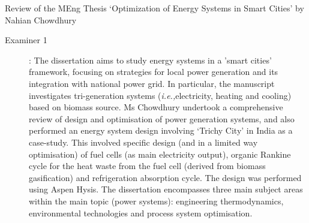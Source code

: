 \documentclass[14pt,twoside]{report}
\newcommand{\ie}{{\it i.e.,}}
\begin{document}

\bigskip

\begin{center}
  {\Large Review of the MEng Thesis `Optimization of Energy Systems in Smart Cities' by Nahian Chowdhury}
\end{center}

\begin{description}
    \item[Examiner 1]: The dissertation aims to study energy systems in a 'smart cities' framework, focusing on strategies for local power generation and its integration with national power grid.  In particular, the manuscript investigates tri-generation systems (\ie electricity, heating and cooling) based on biomass source. Ms Chowdhury undertook a comprehensive review of design and optimisation of power generation systems, and also performed an energy system design involving `Trichy City' in India as a case-study. This involved specific design (and in a limited way optimisation) of fuel cells (as main electricity output), organic Rankine cycle for the heat waste from the fuel cell (derived from biomass gasification) and refrigeration absorption cycle. The design was performed using Aspen Hysis. The dissertation encompasses three main subject areas within the main topic (power systems): engineering thermodynamics, environmental technologies and process system optimisation. 


\end{description}
\end{document}
